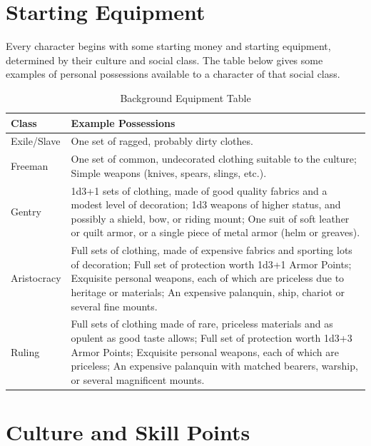 \documentclass[10pt]{article}
\begin{document}
\section{Starting Equipment}
\label{sec:starting_equipment}

Every character begins with some starting money and starting equipment, determined by their culture and social class. The table below gives some examples of personal possessions available to a character of that social class.

\begin{table}[h!]
    \centering
    \caption{Background Equipment Table}
    \label{tab:equipment}
    \begin{tabular}{|p{2.5cm}|p{12cm}|}
        \hline
        \textbf{Class} & \textbf{Example Possessions} \\
        \hline
        Exile/Slave     & One set of ragged, probably dirty clothes. \\
        \hline
        Freeman         & One set of common, undecorated clothing suitable to the culture; Simple weapons (knives, spears, slings, etc.). \\
        \hline
        Gentry          & 1d3+1 sets of clothing, made of good quality fabrics and a modest level of decoration; 1d3 weapons of higher status, and possibly a shield, bow, or riding mount; One suit of soft leather or quilt armor, or a single piece of metal armor (helm or greaves). \\
        \hline
        Aristocracy     & Full sets of clothing, made of expensive fabrics and sporting lots of decoration; Full set of protection worth 1d3+1 Armor Points; Exquisite personal weapons, each of which are priceless due to heritage or materials; An expensive palanquin, ship, chariot or several fine mounts. \\
        \hline
        Ruling          & Full sets of clothing made of rare, priceless materials and as opulent as good taste allows; Full set of protection worth 1d3+3 Armor Points; Exquisite personal weapons, each of which are priceless; An expensive palanquin with matched bearers, warship, or several magnificent mounts. \\
        \hline
    \end{tabular}
\end{table}
\section{Culture and Skill Points}
\label{sec:culture}
\end{document}
